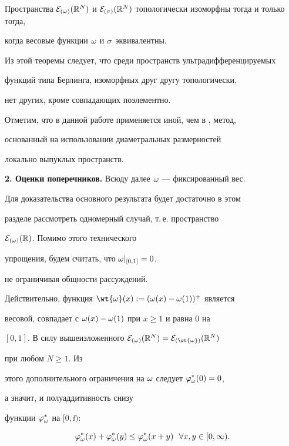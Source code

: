 \begin{thmnonum}


Пространства ${\cal E}_{(\omega)}(\Bbb R^N)$ и ${\cal E}_{(\sigma)}(\Bbb R^N)$ топологически изоморфны тогда и только тогда,


когда весовые функции $\omega$ и $\sigma$ эквивалентны.


\end{thmnonum}





Из этой теоремы следует, что среди пространств ультрадифференцируемых


функций типа Берлинга, изоморфных друг другу топологически,


нет других, кроме совпадающих поэлементно.


Отметим, что в данной работе применяется иной, чем в \cite{Bjorck}, метод,


основанный на использовании диаметральных размерностей


локально выпуклых пространств.


\medskip





{\bf 2. Оценки поперечников.} Всюду далее $\omega$ --- фиксированный вес.


Для доказательства основного результата будет достаточно в этом 


разделе рассмотреть одномерный случай, т.\,е. пространство


${\cal E}_{(\omega)}(\Bbb R)$. Помимо этого технического


упрощения, будем считать, что $\omega|_{[0,1]}=0$,


не ограничивая общности рассуждений.


Действительно, функция $\wt{\o}(x):=(\o(x)-\o(1))^+$ является


весовой, совпадает с $\omega(x)-\omega(1)$ при $x\geq 1$ и равна 0 на


$[0,1]$. В силу вышеизложенного $\eo={\cal E}_{(\wt{\o})}(\rn)$


при любом $N\geq 1$. Из 


этого дополнительного ограничения на $\omega$ следует $\varphi_{\omega}^{*}(0)=0$, 


а значит, и полуаддитивность снизу 


функции $\varphi_{\omega}^{*}$ на $[0,\ii)$:


\begin{equation}\label{e:2}


\vvi(x)+\vvi(y)\leq\vvi(x+y) \ \ \forall x,y\in[0,\ii).


\end{equation}






